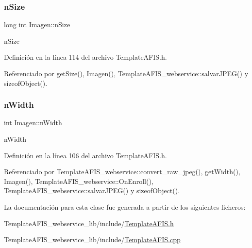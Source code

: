 \hypertarget{classImagen_adb26157b4817c521f092f024d28b9435}{}\label{classImagen_adb26157b4817c521f092f024d28b9435} 
\subsubsection{\texorpdfstring{n\+Size}{nSize}}
{\footnotesize\ttfamily long int Imagen\+::n\+Size}



n\+Size 



Definición en la línea 114 del archivo Template\+A\+F\+I\+S.\+h.



Referenciado por get\+Size(), Imagen(), Template\+A\+F\+I\+S\+\_\+webservice\+::salvar\+J\+P\+E\+G() y sizeof\+Object().

\hypertarget{classImagen_a7b9235e12e5cc50f29614e9c08d72c4f}{}\label{classImagen_a7b9235e12e5cc50f29614e9c08d72c4f} 
\subsubsection{\texorpdfstring{n\+Width}{nWidth}}
{\footnotesize\ttfamily int Imagen\+::n\+Width}



n\+Width 



Definición en la línea 106 del archivo Template\+A\+F\+I\+S.\+h.



Referenciado por Template\+A\+F\+I\+S\+\_\+webservice\+::convert\+\_\+raw\+\_\+jpeg(), get\+Width(), Imagen(), Template\+A\+F\+I\+S\+\_\+webservice\+::\+On\+Enroll(), Template\+A\+F\+I\+S\+\_\+webservice\+::salvar\+J\+P\+E\+G() y sizeof\+Object().



La documentación para esta clase fue generada a partir de los siguientes ficheros\+:\begin{DoxyCompactItemize}
\item 
Template\+A\+F\+I\+S\+\_\+webservice\+\_\+lib/include/\hyperlink{TemplateAFIS_8h}{Template\+A\+F\+I\+S.\+h}\item 
Template\+A\+F\+I\+S\+\_\+webservice\+\_\+lib/include/\hyperlink{TemplateAFIS_8cpp}{Template\+A\+F\+I\+S.\+cpp}\end{DoxyCompactItemize}
